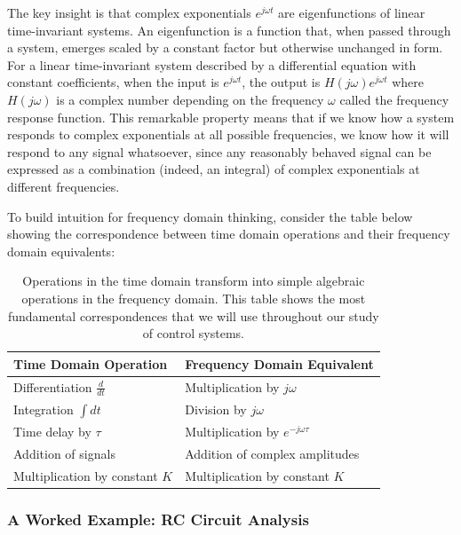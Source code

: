 The key insight is that complex exponentials $e^{j\omega t}$ are eigenfunctions of linear time-invariant systems. An eigenfunction is a function that, when passed through a system, emerges scaled by a constant factor but otherwise unchanged in form. For a linear time-invariant system described by a differential equation with constant coefficients, when the input is $e^{j\omega t}$, the output is $H(j\omega)e^{j\omega t}$ where $H(j\omega)$ is a complex number depending on the frequency $\omega$ called the frequency response function. This remarkable property means that if we know how a system responds to complex exponentials at all possible frequencies, we know how it will respond to any signal whatsoever, since any reasonably behaved signal can be expressed as a combination (indeed, an integral) of complex exponentials at different frequencies.

To build intuition for frequency domain thinking, consider the table below showing the correspondence between time domain operations and their frequency domain equivalents:

\begin{table}[htbp]
    \centering
    \begin{tabular}{p{} p{}}
        \hline
        \textbf{Time Domain Operation} & \textbf{Frequency Domain Equivalent} \\ \hline
        Differentiation $\frac{d}{dt}$ & Multiplication by $j\omega$ \\ \hline
        Integration $\int dt$ & Division by $j\omega$ \\ \hline
        Time delay by $\tau$ & Multiplication by $e^{-j\omega\tau}$ \\ \hline
        Addition of signals & Addition of complex amplitudes \\ \hline
        Multiplication by constant $K$ & Multiplication by constant $K$ \\ \hline
    \end{tabular}
    \caption{Operations in the time domain transform into simple algebraic operations in the frequency domain. This table shows the most fundamental correspondences that we will use throughout our study of control systems.}
    \label{tab:time_frequency_correspondence}
\end{table}

\subsubsection{A Worked Example: RC Circuit Analysis}


